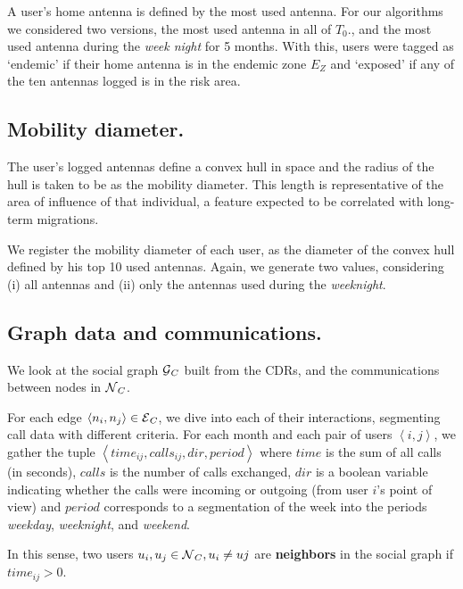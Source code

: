 A user's home antenna is defined by the most used antenna. For our algorithms we considered two versions, the most used antenna in all of $T_0$., and the most used antenna during the \textit{week night} for 5 months. 
With this, users were tagged as `endemic' if their home antenna is in the endemic zone $E_Z$ and `exposed' if any of the ten antennas logged is in the risk area.


\subsection{Mobility diameter.}

The user's logged antennas define a convex hull in space and the radius of the hull is taken to be as the mobility diameter. This length is representative of the area of influence of that individual, a feature expected to be correlated with long-term migrations.

We register the mobility diameter of each user, as the diameter of the convex hull defined by his top 10 used antennas. Again, we generate two values, considering (i) all antennas and (ii) only the antennas used during the \textit{weeknight}.



\subsection{Graph data and communications.}

We look at the social graph $\operatorname{\mathcal{G}}_C$ built from the CDRs, and the communications between nodes in $\operatorname{\mathcal{N}}_C$.

For each edge $\left< n_i, n_j \right> \in \operatorname{\mathcal{E}}_C$, we dive into each of their interactions, segmenting call data with different criteria. For %
each month and each pair of users $\left< i,j \right>$, we gather the tuple $\left< time_{ij}, calls_{ij}, dir, period \right>$ where $time$ is the sum of all calls (in seconds), $calls$ is the number of calls exchanged, $dir$ is a boolean variable indicating whether the calls were incoming or outgoing (from user $i$'s point of view) and $period$ corresponds to a segmentation of the week into the periods \textit{weekday}, \textit{weeknight}, and \textit{weekend}.


In this sense, two users $u_i, u_j \in \operatorname{\mathcal{N}}_C, u_i \neq uj$ are \textbf{neighbors} in the social graph if $time_{ij} > 0$.


